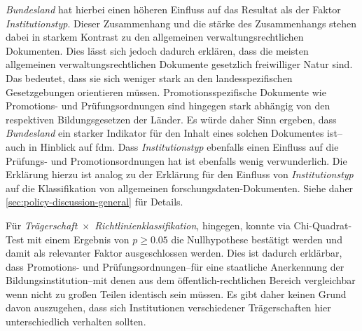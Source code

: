 \textit{Bundesland} hat hierbei einen höheren Einfluss auf das Resultat als der Faktor \textit{Institutionstyp}.
Dieser Zusammenhang und die stärke des Zusammenhangs stehen dabei in starkem Kontrast zu den allgemeinen verwaltungsrechtlichen Dokumenten.
Dies lässt sich jedoch dadurch erklären, dass die meisten allgemeinen verwaltungsrechtlichen Dokumente gesetzlich freiwilliger Natur sind.
Das bedeutet, dass sie sich weniger stark an den landesspezifischen Gesetzgebungen orientieren müssen.
Promotionsspezifische Dokumente wie Promotions- und Prüfungsordnungen sind hingegen stark abhängig von den respektiven Bildungsgesetzen der Länder.
Es würde daher Sinn ergeben, dass \textit{Bundesland} ein starker Indikator für den Inhalt eines solchen Dokumentes ist--auch in Hinblick auf \gls{fdm}.
Dass \textit{Institutionstyp} ebenfalls einen Einfluss auf die Prüfungs- und Promotionsordnungen hat ist ebenfalls wenig verwunderlich.
Die Erklärung hierzu ist analog zu der Erklärung für den Einfluss von \textit{Institutionstyp} auf die Klassifikation von allgemeinen \gls{forschungsdaten}-Dokumenten.
Siehe daher \cref{sec:policy-discussion-general} für Details.

Für \textit{Trägerschaft}~$\times$~\textit{Richtlinienklassifikation}, hingegen, konnte via Chi-Quadrat-Test mit einem Ergebnis von $p\geqslant\num{0,05}$ die Nullhypothese bestätigt werden und damit als relevanter Faktor ausgeschlossen werden.
Dies ist dadurch erklärbar, dass Promotions- und Prüfungsordnungen--für eine staatliche Anerkennung der Bildungsinstitution--mit denen aus dem öffentlich-rechtlichen Bereich vergleichbar wenn nicht zu großen Teilen identisch sein müssen.
Es gibt daher keinen Grund davon auszugehen, dass sich Institutionen verschiedener Trägerschaften hier unterschiedlich verhalten sollten.
\pagebreak

